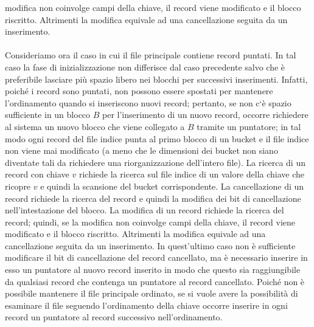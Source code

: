 modifica non coinvolge campi della chiave, il record viene modificato e il blocco riscritto. Altrimenti la modifica 
equivale ad una cancellazione seguita da un inserimento.\\\\
Consideriamo ora il caso in cui il file principale contiene record puntati. In tal caso la fase di inizializzazione 
non differisce dal caso precedente salvo che è preferibile lasciare più spazio libero nei blocchi per successivi inserimenti. 
Infatti, poiché i record sono puntati, non possono essere spostati per mantenere l'ordinamento quando si inseriscono nuovi record;
pertanto, se non c‘è spazio sufficiente in un blocco $B$ per l'inserimento di un nuovo record, occorre
richiedere al sistema un nuovo blocco che viene collegato a $B$ tramite un puntatore; in tal modo
ogni record del file indice punta al primo blocco di un bucket e il file indice non viene mai
modificato (a meno che le dimensioni dei bucket non siano diventate tali da richiedere una
riorganizzazione dell'intero file). La ricerca di un record con chiave $v$ richiede la ricerca sul file
indice di un valore della chiave che ricopre $v$ e quindi la scansione del bucket corrispondente. La
cancellazione di un record richiede la ricerca del record e quindi la modifica dei bit di cancellazione
nell'intestazione del blocco. La modifica di un record richiede la ricerca del record; quindi, se la
modifica non coinvolge campi della chiave, il record viene modificato e il blocco riscritto.
Altrimenti la modifica equivale ad una cancellazione seguita da un inserimento. In quest'ultimo
caso non è sufficiente modificare il bit di cancellazione del record cancellato, ma è necessario
inserire in esso un puntatore al nuovo record inserito in modo che questo sia raggiungibile da
qualsiasi record che contenga un puntatore al record cancellato.
Poiché non è possibile mantenere il file principale ordinato, se si vuole avere la possibilità di
esaminare il file seguendo l'ordinamento della chiave occorre inserire in ogni record un puntatore al
record successivo nell'ordinamento.


